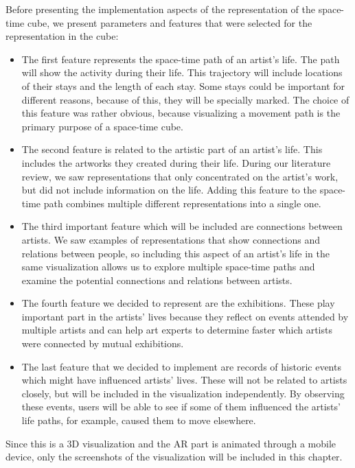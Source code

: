 Before presenting the implementation aspects of the representation of the space-time cube, we present parameters and features that were selected for the representation in the cube:
\begin{itemize}
    \item The first feature represents the space-time path of an artist's life. The path will show the activity during their life. This trajectory will include locations of their stays and the length of each stay. Some stays could be important for different reasons, because of this, they will be specially marked. The choice of this feature was rather obvious, because visualizing a movement path is the primary purpose of a space-time cube.
    \item The second feature is related to the artistic part of an artist's life. This includes the artworks they created during their life. During our literature review, we saw representations that only concentrated on the artist's work, but did not include information on the life. Adding this feature to the space-time path combines multiple different representations into a single one.
    \item The third important feature which will be included are connections between artists. We saw examples of representations that show connections and relations between people, so including this aspect of an artist's life in the same visualization allows us to explore multiple space-time paths and examine the potential connections and relations between artists.
    \item The fourth feature we decided to represent are the exhibitions. These play important part in the artists' lives because they reflect on events attended by multiple artists and can help art experts to determine faster which artists were connected by mutual exhibitions.
    \item The last feature that we decided to implement are records of historic events which might have influenced artists' lives. These will not be related to artists closely, but will be included in the visualization independently. By observing these events, users will be able to see if some of them influenced the artists' life paths, for example, caused them to move elsewhere.
\end{itemize}

Since this is a 3D visualization and the AR part is animated through a mobile device, only the screenshots of the visualization will be
included in this chapter.